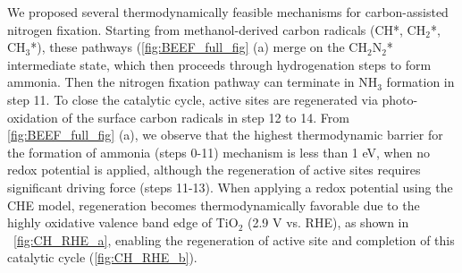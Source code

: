 
We proposed several thermodynamically feasible mechanisms for carbon-assisted nitrogen fixation. Starting from methanol-derived carbon radicals (CH*, CH$_2$*, CH$_3$*), these pathways (\ref{fig:BEEF_full_fig} (a) merge on the CH$_2$N$_2$* intermediate state, which then proceeds through hydrogenation steps to form ammonia. Then the nitrogen fixation pathway can terminate in NH$_3$ formation in step 11. To close the catalytic cycle, active sites are regenerated via photo-oxidation of the surface carbon radicals in step 12 to 14. From \ref{fig:BEEF_full_fig} (a), we observe that the highest thermodynamic barrier for the formation of ammonia (steps 0-11) mechanism is less than 1 eV, when no redox potential is applied, although the regeneration of active sites requires significant driving force (steps 11-13). When applying a redox potential using the CHE model, regeneration becomes thermodynamically favorable due to the highly oxidative valence band edge of TiO$_2$ (2.9 V vs. RHE), as shown in ~\ref{fig:CH_RHE_a}, enabling the regeneration of active site and completion of this catalytic cycle (\ref{fig:CH_RHE_b}).

